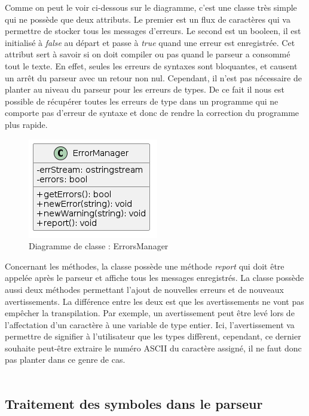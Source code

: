 \documentclass[a4paper]{article}%
\begin{document}
Comme on peut le voir ci-dessous sur le diagramme, c'est une classe très simple
qui ne possède que deux attributs. Le premier est un flux de caractères qui va
permettre de stocker tous les messages d'erreurs. Le second est un booleen, il
est initialisé à \textit{false} au départ et passe à \textit{true} quand une
erreur est enregistrée. Cet attribut sert à savoir si on doit compiler ou pas
quand le parseur a consommé tout le texte. En effet, seules les erreurs de
syntaxes sont bloquantes, et causent un arrêt du parseur avec un retour non nul.
Cependant, il n'est pas nécessaire de planter au niveau du parseur pour les
erreurs de types. De ce fait il nous est possible de récupérer toutes les
erreurs de type dans un programme qui ne comporte pas d'erreur de syntaxe et
donc de rendre la correction du programme plus rapide.

\clearpage
\begin{figure}[h!]
  \begin{center}
  \includegraphics[scale=0.5]{../ressources/diagrams/errMgr.png}
  \caption{Diagramme de classe : ErrorsManager}
  \end{center}
\end{figure}

Concernant les méthodes, la classe possède une méthode \textit{report} qui doit
être appelée après le parseur et affiche tous les messages enregistrés. La
classe possède aussi deux méthodes permettant l'ajout de nouvelles erreurs et
de nouveaux avertissements. La différence entre les deux est que les
avertissements ne vont pas empêcher la transpilation. Par exemple, un
avertissement peut être levé lors de l'affectation d'un caractère à une variable
de type entier. Ici, l'avertissement va permettre de signifier à l'utilisateur
que les types diffèrent, cependant, ce dernier souhaite peut-être extraire le
numéro ASCII du caractère assigné, il ne faut donc pas planter dans ce genre de
cas.\\~\\

\subsection{Traitement des symboles dans le parseur}
\end{document}
